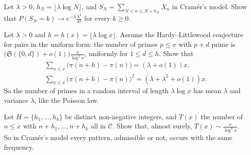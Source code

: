 \begin{exercise}[$\star\star$]\label{ex:modelpoisson}
Let $\lambda>0$, $h_N=\lfloor\lambda\log N\rfloor$, and $S_N=\sum_{N<n\le N+h_N}X_n$ in Cramér's model. Show that $P(S_N=k)\to e^{-\lambda}\frac{\lambda^k}{k!}$ for every $k\ge0$.
\end{exercise}

\begin{exercise}\label{ex:pairsvariance}
Let $\lambda>0$ and $h=h(x)=\lfloor\lambda\log x\rfloor$. Assume the Hardy--Littlewood conjecture for pairs in the uniform form: the number of primes $p\le x$ with $p+d$ prime is
$\bigl(\mathfrak S(\{0,d\})+o(1)\bigr)\frac x{\log^2x}$, uniformly for $1\le d\le h$. Show that
\[
\begin{gathered}\sum_{n\le x}\bigl(\pi(n+h)-\pi(n)\bigr)=(\lambda+o(1))x,\\\sum_{n\le x}\bigl(\pi(n+h)-\pi(n)\bigr)^2=(\lambda+\lambda^2+o(1))x.\end{gathered}
\]
So the number of primes in a random interval of length $\lambda\log x$ has mean $\lambda$ and variance $\lambda$, like the Poisson law.
\end{exercise}

\begin{exercise}[$\star\star\star$]\label{ex:modeltuples}
Let $H=\{h_1,\dots,h_k\}$ be distinct non-negative integers, and $T(x)$ the number of $n\le x$ with $n+h_1,\dots,n+h_k$ all in $\mathcal C$. Show that, almost surely, $T(x)\sim\frac x{\log^kx}$. So in Cramér's
model every pattern, admissible or not, occurs with the same frequency.
\end{exercise}

